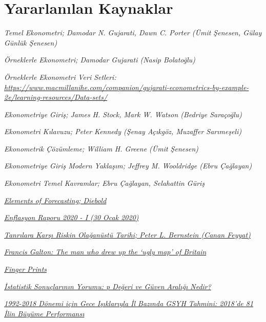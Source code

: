 \documentclass[
]{book}
\begin{document}
\hypertarget{yararlanux131lan-kaynaklar}{%
\chapter{Yararlanılan Kaynaklar}\label{yararlanux131lan-kaynaklar}}

\emph{Temel Ekonometri; Damodar N. Gujarati, Dawn C. Porter (Ümit Şenesen, Gülay Günlük Şenesen)}

\emph{Örneklerle Ekonometri; Damodar Gujarati (Nasip Bolatoğlu)}

\emph{Örneklerle Ekonometri Veri Setleri: \url{https://www.macmillanihe.com/companion/gujarati-econometrics-by-example-2e/learning-resources/Data-sets/}}

\emph{Ekonometriye Giriş; James H. Stock, Mark W. Watson (Bedriye Saraçoğlu)}

\emph{Ekonometri Kılavuzu; Peter Kennedy (Şenay Açıkgöz, Muzaffer Sarımeşeli)}

\emph{Ekonometrik Çözümleme; William H. Greene (Ümit Şenesen)}

\emph{Ekonometriye Giriş Modern Yaklaşım; Jeffrey M. Wooldridge (Ebru Çağlayan)}

\emph{Ekonometri Temel Kavramlar; Ebru Çağlayan, Selahattin Güriş}

\href{https://www.sas.upenn.edu/~fdiebold/Teaching221/FullBook.pdf}{\emph{Elements of Forecasting; Diebold}}

\href{https://www.tcmb.gov.tr/wps/wcm/connect/TR/TCMB+TR/Main+Menu/Yayinlar/Raporlar/Enflasyon+Raporu/2020/Enflasyon+Raporu+2020+-+I}{\emph{Enflasyon Raporu 2020 - I (30 Ocak 2020)}}

\href{http://professor.ufabc.edu.br/~nelson.faustino/Ensino/IPE2016/Livros/Peter\%20L.\%20Bernstein-Against\%20the\%20Gods_\%20The\%20Remarkable\%20Story\%20of\%20Risk-Wiley\%20(1998)\%20(1).pdf}{\emph{Tanrılara Karşı Riskin Olağanüstü Tarihi; Peter L. Bernstein (Canan Feyyat)}}

\href{https://www.bbc.com/news/magazine-13775520}{\emph{Francis Galton: The man who drew up the `ugly map' of Britain}}

\href{http://galton.org/books/finger-prints/galton-1892-fingerprints-1up.pdf}{\emph{Finger Prints}}

\href{https://www.toraks.org.tr/uploadFiles/book/file/1832014154715-113.pdf}{\emph{İstatistik Sonuçlarının Yorumu: p Değeri ve Güven Aralığı Nedir?}}

\href{https://www.tepav.org.tr/upload/mce/2019/haberler/gece_isiklariyla_il_bazinda_gsyh_tahmini_19922018.pdf}{\emph{1992-2018 Dönemi için Gece Işıklarıyla İl Bazında GSYH Tahmini: 2018'de 81 İlin Büyüme Performansı}}
\end{document}
